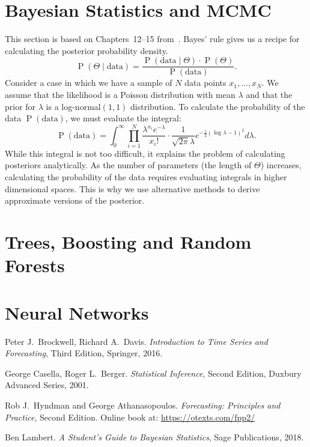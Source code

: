 \documentclass[11pt,a4]{article}
\DeclareMathOperator{\pr}{P}
\begin{document}
\section{Bayesian Statistics and MCMC}
This section is based on Chapters~12--15 from~\cite{Lam}. Bayes' rule gives us a
 recipe for calculating the posterior probability density. 
\begin{equation}
	\pr (\Theta \mid \text{data}) = 
	\frac{\pr (\text{data} \mid \Theta) \cdot \pr (\Theta)}{\pr (\text{data})}.
\end{equation}
Consider a case in which we have a sample of $N$ data points $x_1, \ldots, x_N$. 
We assume that the likelihood is a Poisson distribution with mean $\lambda$ and that
the prior for $\lambda$ is a log-normal$(1, 1)$ distribution. To calculate the probability
of the data $\pr (\text{data})$, we must evaluate the integral:
\begin{equation}
	\pr (\text{data}) = \int_{0}^{\infty} 
		\prod_{i = 1}^N \frac{\lambda^{x_i} e^{- \lambda}}{x_i!} \cdot 
		\frac{1}{\sqrt{2 \pi} \lambda} e^{- \frac{1}{2} (\log \lambda - 1)^2} 
		d\lambda.
\end{equation}
While this integral is not too difficult, it explains the problem of calculating 
posteriors analytically. As the number of parameters (the length of $\Theta$) 
increases, calculating the probability of the data requires evaluating integrals 
in higher dimensional spaces. This is why we use alternative methods to derive 
approximate versions of the posterior.

\section{Trees, Boosting and Random Forests}

\section{Neural Networks}

\begin{thebibliography}{99}

 Peter J.~Brockwell, Richard A.~Davis. \emph{Introduction to Time Series and Forecasting}, Third Edition, Springer, 2016. 

 George Casella, Roger L.~Berger. \emph{Statistical Inference}, 
Second Edition, Duxbury Advanced Series, 2001.

 Rob J.~Hyndman and George Athanasopoulos. \emph{Forecasting: Principles and Practice}, Second Edition. Online book at: \url{https://otexts.com/fpp2/}

 Ben Lambert. \emph{A Student's Guide to Bayesian Statistics}, Sage 
Publications, 2018. 

\end{thebibliography}
\end{document}
